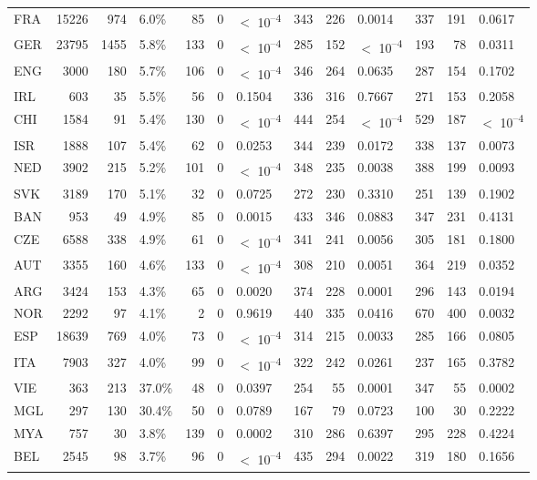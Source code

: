 \begin{tabular}[t]{lrrlrrlrrlrrl}
FRA & 15226 & 974 & 6.0\% & 85 & 0 & $<$ 10\textsuperscript{--4} & 343 & 226 & 0.0014 & 337 & 191 & 0.0617\\
GER & 23795 & 1455 & 5.8\% & 133 & 0 & $<$ 10\textsuperscript{--4} & 285 & 152 & $<$ 10\textsuperscript{--4} & 193 & 78 & 0.0311\\
ENG & 3000 & 180 & 5.7\% & 106 & 0 & $<$ 10\textsuperscript{--4} & 346 & 264 & 0.0635 & 287 & 154 & 0.1702\\
IRL & 603 & 35 & 5.5\% & 56 & 0 & 0.1504 & 336 & 316 & 0.7667 & 271 & 153 & 0.2058\\
CHI & 1584 & 91 & 5.4\% & 130 & 0 & $<$ 10\textsuperscript{--4} & 444 & 254 & $<$ 10\textsuperscript{--4} & 529 & 187 & $<$ 10\textsuperscript{--4}\\
ISR & 1888 & 107 & 5.4\% & 62 & 0 & 0.0253 & 344 & 239 & 0.0172 & 338 & 137 & 0.0073\\
NED & 3902 & 215 & 5.2\% & 101 & 0 & $<$ 10\textsuperscript{--4} & 348 & 235 & 0.0038 & 388 & 199 & 0.0093\\
SVK & 3189 & 170 & 5.1\% & 32 & 0 & 0.0725 & 272 & 230 & 0.3310 & 251 & 139 & 0.1902\\
BAN & 953 & 49 & 4.9\% & 85 & 0 & 0.0015 & 433 & 346 & 0.0883 & 347 & 231 & 0.4131\\
CZE & 6588 & 338 & 4.9\% & 61 & 0 & $<$ 10\textsuperscript{--4} & 341 & 241 & 0.0056 & 305 & 181 & 0.1800\\
AUT & 3355 & 160 & 4.6\% & 133 & 0 & $<$ 10\textsuperscript{--4} & 308 & 210 & 0.0051 & 364 & 219 & 0.0352\\
ARG & 3424 & 153 & 4.3\% & 65 & 0 & 0.0020 & 374 & 228 & 0.0001 & 296 & 143 & 0.0194\\
NOR & 2292 & 97 & 4.1\% & 2 & 0 & 0.9619 & 440 & 335 & 0.0416 & 670 & 400 & 0.0032\\
ESP & 18639 & 769 & 4.0\% & 73 & 0 & $<$ 10\textsuperscript{--4} & 314 & 215 & 0.0033 & 285 & 166 & 0.0805\\
ITA & 7903 & 327 & 4.0\% & 99 & 0 & $<$ 10\textsuperscript{--4} & 322 & 242 & 0.0261 & 237 & 165 & 0.3782\\
VIE & 363 & 213 & 37.0\% & 48 & 0 & 0.0397 & 254 & 55 & 0.0001 & 347 & 55 & 0.0002\\
MGL & 297 & 130 & 30.4\% & 50 & 0 & 0.0789 & 167 & 79 & 0.0723 & 100 & 30 & 0.2222\\
MYA & 757 & 30 & 3.8\% & 139 & 0 & 0.0002 & 310 & 286 & 0.6397 & 295 & 228 & 0.4224\\
BEL & 2545 & 98 & 3.7\% & 96 & 0 & $<$ 10\textsuperscript{--4} & 435 & 294 & 0.0022 & 319 & 180 & 0.1656\\

\end{tabular}
